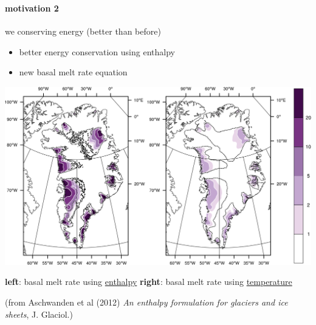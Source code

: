 \documentclass[hide notes,intlimits]{beamer}
\begin{document}
\begin{frame}
  \frametitle{\whytitle}
  \framesubtitle{motivation 2}

\vspace{-6mm}
\begin{center}
  we  conserving energy (better than before)
\end{center}
  
\vspace{-2mm}
  \begin{itemize}
    \item better energy conservation using enthalpy
    \item new basal melt rate equation
  \end{itemize}

  \begin{center}
    \includegraphics[height=0.6\textheight]{figs/enthalpy-model-crop}
    
    \medskip
    \scriptsize \textbf{left}: basal melt rate using \underline{enthalpy} \qquad \textbf{right}: basal melt rate using \underline{temperature}

    \tiny (from Aschwanden et al (2012) \emph{An enthalpy formulation for glaciers and ice sheets}, J. Glaciol.)
  \end{center}
\end{frame}
\end{document}
